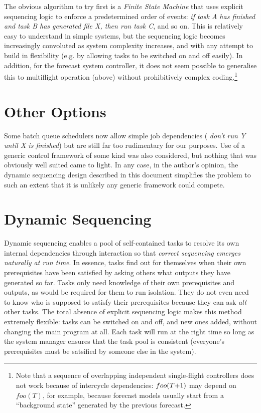 \documentclass[11pt,a4paper]{report}
\begin{document}
The obvious algorithm to try first is a {\em Finite State Machine} that
uses explicit sequencing logic to enforce a predetermined order of
events: {\em if task A has finished and task B has generated file X,
then run task C}, and so on. This is relatively easy to understand in
simple systems, but the sequencing logic becomes increasingly convoluted
as system complexity increases, and with any attempt to build in
flexibility (e.g. by allowing tasks to be switched on and off easily).
In addition, for the forecast system controller, it does not seem
possible to generalise this to multiflight operation (above) without
prohibitively complex coding.\footnote{Note that a sequence of
overlapping independent single-flight controllers does not work because
of intercycle dependencies: $foo(T\negmedspace +\negmedspace 1)$ may
depend on $foo(T)$, for example, because forecast models usually start
from a ``background state'' generated by the previous forecast.} 


\section{Other Options}

Some batch queue schedulers now allow simple job dependencies ({\em
don't run Y until X is finished}) but are still far too rudimentary for
our purposes.  Use of a generic control framework of some kind was also
considered, but nothing that was obviously well suited came to light. In
any case, in the author's opinion, the dynamic sequencing design
described in this document simplifies the problem to such an extent that
it is unlikely any generic framework could compete.  

\section{Dynamic Sequencing}

Dynamic sequencing enables a pool of self-contained tasks to resolve its
own internal dependencies through interaction so that {\em correct
sequencing emerges naturally at run time}.  In essence, tasks find out
for themselves when their own prerequisites have been satisfied by
asking others what outputs they have generated so far.  Tasks only need
knowledge of their own  prerequisites and outputs, as would be required
for them to run isolation. They do not even need to know who is supposed
to satisfy their prerequisites because they can ask {\em all} other
tasks. The total absence of explicit sequencing logic makes this method
extremely flexible: tasks can be switched on and off, and new ones
added, without changing the main program at all.  Each task will run at
the right time so long as the system manager ensures that the task pool
is consistent (everyone's prerequisites must be satsified by someone
else in the system).
\end{document}
